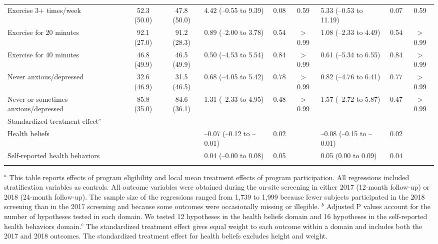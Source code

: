 \documentclass{article}
\begin{document}
\begin{landscape}
\begin{table}[tbp]
{\begin{tabularx}{\linewidth}{lCClCClCC}
\hspace{1em} Exercise 3+ times/week&52.3  (50.0)&47.8  (50.0)&4.42 (--0.55 to 9.39)&0.08&0.59&5.33 (--0.53 to 11.19)&0.07&0.59 \tabularnewline
\hspace{1em} Exercise for 20 minutes&92.1  (27.0)&91.2  (28.3)&0.89 (--2.00 to 3.78)&0.54&$>$0.99&1.08 (--2.33 to 4.49)&0.54&$>$0.99 \tabularnewline
\hspace{1em} Exercise for 40 minutes&46.8  (49.9)&46.5  (49.9)&0.50 (--4.53 to 5.54)&0.84&$>$0.99&0.61 (--5.34 to 6.55)&0.84&$>$0.99 \tabularnewline
\hspace{1em} Never anxious/depressed&32.6  (46.9)&31.5  (46.5)&0.68 (--4.05 to 5.42)&0.78&$>$0.99&0.82 (--4.76 to 6.41)&0.77&$>$0.99 \tabularnewline
\hspace{1em} Never or sometimes anxious/depressed&85.8  (35.0)&84.6  (36.1)&1.31 (--2.33 to 4.95)&0.48&$>$0.99&1.57 (--2.72 to 5.87)&0.47&$>$0.99 \tabularnewline
Standardized treatment effect$^{c}$&&&&&&&& \tabularnewline
\hspace{1em} Health beliefs&&&--0.07 (--0.12 to --0.01)&0.02&&--0.08 (--0.15 to --0.01)&0.02& \tabularnewline
\hspace{1em} Self‐reported health behaviors&&&0.04 (--0.00 to 0.08)&0.05&&0.05 (0.00 to 0.09)&0.04& \tabularnewline
\bottomrule \addlinespace[\belowrulesep]

\end{tabularx}
\begin{flushleft}
\tiny $^{a}$ This table reports effects of program eligibility and local mean treatment effects of program participation. All regressions included stratification variables as controls. All outcome variables were obtained during the on-site screening in either 2017 (12-month follow-up) or 2018 (24-month follow-up). The sample size of the regressions ranged from 1,739 to 1,999 because fewer subjects participated in the 2018 screening than in the 2017 screening and because some outcomes were occasionally missing or illegible. \newline $^{b}$ Adjusted P values account for the number of hypotheses tested in each domain. We tested 12 hypotheses in the health beliefs domain and 16 hypotheses in the self-reported health behaviors domain.\newline $^{c}$ The standardized treatment effect gives equal weight to each outcome within a domain and includes both the 2017 and 2018 outcomes. The standardized treatment effect for health beliefs excludes height and weight.
\end{flushleft}
}
\end{table}
\end{landscape}
\end{document}
